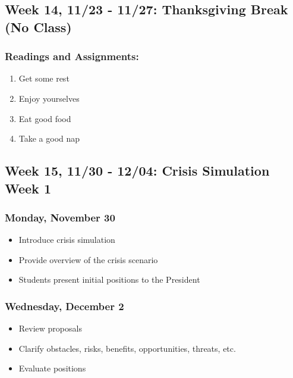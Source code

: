\documentclass[
  letterpaper,
  DIV=11,
  numbers=noendperiod]{scrartcl}
\providecommand{\tightlist}{%
  \setlength{\itemsep}{0pt}\setlength{\parskip}{0pt}}
\begin{document}
\subsection{Week 14, 11/23 - 11/27: Thanksgiving Break (No
Class)}\label{week-14-1123---1127-thanksgiving-break-no-class}

\subsubsection{Readings and
Assignments:}\label{readings-and-assignments-13}

\begin{enumerate}
\def\labelenumi{\arabic{enumi}.}
\tightlist
\item
  Get some rest
\item
  Enjoy yourselves
\item
  Eat good food
\item
  Take a good nap
\end{enumerate}

\subsection{Week 15, 11/30 - 12/04: Crisis Simulation Week
1}\label{week-15-1130---1204-crisis-simulation-week-1}

\subsubsection{Monday, November 30}\label{monday-november-30}

\begin{itemize}
\tightlist
\item
  Introduce crisis simulation
\item
  Provide overview of the crisis scenario
\item
  Students present initial positions to the President
\end{itemize}

\subsubsection{Wednesday, December 2}\label{wednesday-december-2}

\begin{itemize}
\tightlist
\item
  Review proposals
\item
  Clarify obstacles, risks, benefits, opportunities, threats, etc.
\item
  Evaluate positions
\end{itemize}
\end{document}

